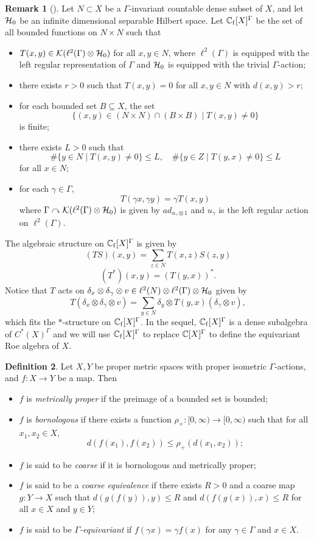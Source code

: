 \documentclass[11pt]{article}
\theoremstyle{definition}
\newtheorem{Def}{Definition}[section]
\newtheorem{Rem}[Def]{Remark}
\theoremstyle{plain}
\def\ox{\otimes}
\def\ox{\otimes}
\def\Ga{\Gamma}
\def\car{\curvearrowright}
\begin{document}
\begin{Rem}[\cite{Yu2000}]\label{Roe finite}
Let $N\subset X$ be a $\Gamma$-invariant countable dense subset of $X$, and let $\mathcal H_0$ be an infinite dimensional separable Hilbert space. Let $\IC_{\rm f}[X]^{\Ga}$ be the set of all bounded functions on $N\times N$ such that\begin{itemize}
\item[(1)] $T(x,y)\in \K(\ell^2(\Ga)\ox\H_0)$ for all $x,y\in N$, where $\ell^2(\Ga)$ is equipped with the left regular representation of $\Ga$ and $\mathcal H_0$ is equipped with the trivial $\Ga$-action;
\item[(2)] there exists $r>0$ such that $T(x,y)=0$ for all $x,y\in N$ with $d(x,y)>r$;
\item[(3)] for each bounded set $B\subseteq X$, the set
$$\{(x,y)\in (N\times N)\cap (B\times B)\mid T(x,y)\ne0\}$$
is finite;
\item[(4)]there exists $L>0$ such that
$$\#\{y\in N\mid T(x,y)\ne0\}\leq L,\quad\#\{y\in Z\mid T(y,x)\ne0\}\leq L$$
for all $x\in N$;
\item[(5)] for each $\gamma\in\Ga$,
$$T(\gamma x,\gamma y)=\gamma T(x,y)$$
where $\Ga\car\K(\ell^2(\Ga)\ox\H_0)$ is given by $ad_{u_{\gamma}\ox 1}$ and $u_{\gamma}$ is the left regular action on $\ell^2(\Ga)$.
\end{itemize}
The algebraic structure on $\IC_{\rm f}[X]^{\Ga}$ is given by
$$(TS)(x,y)=\sum_{z\in N}T(x,z)S(z,y)$$
$$(T^*)(x,y)=(T(y,x))^*.$$
Notice that $T$ acts on $\delta_x\ox\delta_{\gamma}\ox v\in\ell^{2}(N)\ox\ell^2(\Ga)\ox\H_0$ given by
$$T(\delta_x\ox\delta_{\gamma}\ox v)=\sum_{y\in N}\delta_y\ox T(y,x)(\delta_{\gamma}\ox v),$$
which fits the $*$-structure on $\IC_{\rm f}[X]^{\Ga}$. In the sequel, $\IC_{\rm f}[X]^{\Ga}$ is a dense subalgebra of $C^*(X)^{\Ga}$ and we will use $\IC_{\rm f}[X]^{\Ga}$ to replace $\IC[X]^{\Ga}$ to define the equivariant Roe algebra of $X$.
\end{Rem}

\begin{Def}
Let $X, Y$ be proper metric spaces with proper isometric $\Ga$-actions, and $f: X\to Y$ be a map. Then\begin{itemize}
\item[(1)] $f$ is \emph{metrically proper} if the preimage of a bounded set is bounded;
\item[(2)] $f$ is \emph{bornologous} if there exists a function $\rho_+:[0,\infty)\to[0,\infty)$ such that for all $x_1,x_2\in X$,
$$d(f(x_1),f(x_2))\leq \rho_+(d(x_1,x_2));$$
\item[(3)] $f$ is said to be \emph{coarse} if it is bornologous and metrically proper;
\item[(4)] $f$ is said to be a \emph{coarse equivalence} if there exists $R>0$ and a coarse map $g:Y\to X$ such that $d(g(f(y)),y)\leq R$ and $d(f(g(x)),x)\leq R$ for all $x\in X$ and $y\in Y$;
\item[(5)] $f$ is said to be \emph{$\Ga$-equivariant} if $f(\gamma x)=\gamma f(x)$ for any $\gamma\in\Ga$ and $x\in X$.
\end{itemize}\end{Def}
\end{document}

